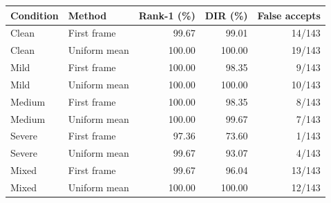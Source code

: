 \begin{tabular}{llrrr}
\hline
Condition & Method & Rank-1 (\%) & DIR (\%) & False accepts \\
\hline
Clean & First frame & 99.67 & 99.01 & 14/143 \\
Clean & Uniform mean & 100.00 & 100.00 & 19/143 \\
Mild & First frame & 100.00 & 98.35 & 9/143 \\
Mild & Uniform mean & 100.00 & 100.00 & 10/143 \\
Medium & First frame & 100.00 & 98.35 & 8/143 \\
Medium & Uniform mean & 100.00 & 99.67 & 7/143 \\
Severe & First frame & 97.36 & 73.60 & 1/143 \\
Severe & Uniform mean & 99.67 & 93.07 & 4/143 \\
Mixed & First frame & 99.67 & 96.04 & 13/143 \\
Mixed & Uniform mean & 100.00 & 100.00 & 12/143 \\
\hline
\end{tabular}
